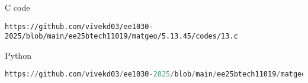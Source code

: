 \documentclass{beamer}
\begin{document}
\begin{frame}[fragile]{C code}
\begin{lstlisting}
https://github.com/vivekd03/ee1030-2025/blob/main/ee25btech11019/matgeo/5.13.45/codes/13.c
\end{lstlisting}
\end{frame}
\begin{frame}[fragile]{Python}
\begin{lstlisting}[language=Python]
https://github.com/vivekd03/ee1030-2025/blob/main/ee25btech11019/matgeo/5.13.45/codes/13.py
\end{lstlisting}
\end{frame}
\end{document}
